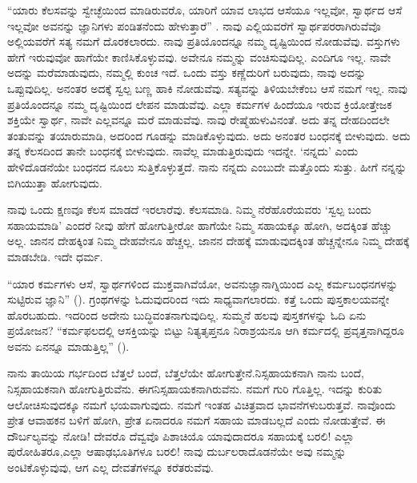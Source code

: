 “ಯಾರು ಕೆಲಸವನ್ನು ಸ್ವೇಚ್ಛೆಯಿಂದ ಮಾಡಿರುವರೊ, ಯಾರಿಗೆ ಯಾವ ಲಾಭದ ಆಸೆಯೂ ಇಲ್ಲವೋ, ಸ್ವಾರ್ಥದ ಆಸೆ ಇಲ್ಲವೋ ಅವನನ್ನು ಜ್ಞಾನಿಗಳು ಪಂಡಿತನೆಂದು ಹೇಳುತ್ತಾರೆ” . ನಾವು ಎಲ್ಲಿಯವರೆಗೆ ಸ್ವಾರ್ಥಪರರಾಗಿರುವೆವೊ ಅಲ್ಲಿಯವರೆಗೆ ಸತ್ಯ ನಮಗೆ ದೊರಕಲಾರದು. ನಾವು ಪ್ರತಿಯೊಂದನ್ನೂ ನಮ್ಮ ದೃಷ್ಟಿಯಿಂದ ನೋಡುವೆವು. ವಸ್ತುಗಳು ಹೇಗೆ ಇರುವುವೋ ಹಾಗೆಯೇ ಕಾಣಿಸಿಕೊಳ್ಳುವವು. ಅವೇನೂ ನಮ್ಮನ್ನು ವಂಚಿಸುವುದಿಲ್ಲ. ಎಂದಿಗೂ ಇಲ್ಲ. ನಾವೇ ಅದನ್ನು ಮರೆಮಾಡುವುದು, ನಮ್ಮಲ್ಲಿ ಕುಂಚ ಇದೆ. ಒಂದು ವಸ್ತು ಕಣ್ಣೆದುರಿಗೆ ಬರುವುದು, ನಾವು ಅದನ್ನು ಒಪ್ಪುವುದಿಲ್ಲ. ಅನಂತರ ಅದಕ್ಕೆ ಸ್ವಲ್ಪ ಬಣ್ಣ ಹಾಕಿ ನೋಡುವೆವು. ಸತ್ಯವನ್ನು ತಿಳಿಯಬೇಕೆಂಬ ಆಸೆ ನಮಗೆ ಇಲ್ಲ. ನಾವು ಪ್ರತಿಯೊಂದನ್ನೂ ನಮ್ಮ ದೃಷ್ಟಿಯಿಂದ ಲೇಪನ ಮಾಡುವೆವು. ಎಲ್ಲಾ ಕರ್ಮಗಳ ಹಿಂದೆಯೂ ಇರುವ ಕ್ರಿಯೋತ್ತೇಜಕ ಶಕ್ತಿಯೇ ಸ್ವಾರ್ಥ, ನಾವೇ ಎಲ್ಲವನ್ನೂ ಮರೆ ಮಾಡುವೆವು. ನಾವು ರೇಷ್ಮೆಹುಳುವಿನಂತೆ. ಅದು ತನ್ನ ದೇಹದಿಂದಲೇ ತಂತುವನ್ನು ತಯಾರುಮಾಡಿ, ಅದರಿಂದ ಗೂಡನ್ನು ಮಾಡಿಕೊಳ್ಳುವುದು. ಅದು ಅನಂತರ ಬಂಧನಕ್ಕೆ ಬೀಳುವುದು. ಅದು ತನ್ನ ಕೆಲಸದಿಂದ ತಾನೇ ಬಂಧನಕ್ಕೆ ಬೀಳುವುದು. ನಾವೆಲ್ಲ ಮಾಡುತ್ತಿರುವುದು ಇದನ್ನೇ. ‘ನನ್ನದು’ ಎಂದು ಹೇಳಿದೊಡನೆಯೇ ಬಂಧನದ ನೂಲು ಸುತ್ತಿಕೊಳ್ಳುತ್ತದೆ. ನಾನು ನನ್ನದು ಎಂಬುದೇ ಮತ್ತೊಂದು ಸುತ್ತು. ಹೀಗೆ ನನ್ನನ್ನು ಬಿಗಿಯುತ್ತಾ ಹೋಗುವುದು.

ನಾವು ಒಂದು ಕ್ಷಣವೂ ಕೆಲಸ ಮಾಡದೆ ಇರಲಾರೆವು. ಕೆಲಸಮಾಡಿ. ನಿಮ್ಮ ನೆರೆಹೊರೆಯವರು ‘ಸ್ವಲ್ಪ ಬಂದು ಸಹಾಯಮಾಡಿ’ ಎಂದರೆ ನೀವು ಹೇಗೆ ಹೋಗುತ್ತೀರೋ ಹಾಗೆಯೇ ನಿಮ್ಮ ಸಹಾಯಕ್ಕೂ ಹೋಗಿ, ಅದಕ್ಕಿಂತ ಹೆಚ್ಚು ಅಲ್ಲ. ಜಾನನ ದೇಹಕ್ಕಿಂತ ನಿಮ್ಮ ದೇಹವೇನೂ ಹೆಚ್ಚಲ್ಲ. ಜಾನನ ದೇಹಕ್ಕೆ ಮಾಡುವುದಕ್ಕಿಂತ ಹೆಚ್ಚನ್ನೇನೂ ನಿಮ್ಮ ದೇಹಕ್ಕೆ ಮಾಡಬೇಡಿ. ಇದೇ ಧರ್ಮ.

“ಯಾರ ಕರ್ಮಗಳು ಆಸೆ, ಸ್ವಾರ್ಥಗಳಿಂದ ಮುಕ್ತವಾಗಿವೆಯೋ, ಅವನು\break ಜ್ಞಾನಾಗ್ನಿಯಿಂದ ಎಲ್ಲ ಕರ್ಮಬಂಧನಗಳನ್ನು ಸುಟ್ಟಿರುವ ಜ್ಞಾನಿ” (). ಗ್ರಂಥಗಳನ್ನು ಓದುವುದರಿಂದ ಇದು ಸಾಧ್ಯವಾಗಲಾರದು. ಕತ್ತೆ ಒಂದು ಪುಸ್ತಕಾಲಯವನ್ನೇ ಹೊರಬಹುದು. ಇದರಿಂದ ಅದೇನು ಬುದ್ಧಿವಂತನಾಗುವುದಿಲ್ಲ. ಸುಮ್ಮನೆ ಹಲವು ಪುಸ್ತಕಗಳನ್ನು ಓದಿ ಏನು ಪ್ರಯೋಜನ? “ಕರ್ಮಫಲದಲ್ಲಿ ಆಸಕ್ತಿಯನ್ನು ಬಿಟ್ಟು ನಿತ್ಯತೃಪ್ತನೂ ನಿರಾಶ್ರಯನೂ ಆಗಿ ಕರ್ಮದಲ್ಲಿ ಪ್ರವೃತ್ತನಾಗಿದ್ದರೂ ಅವನು ಏನನ್ನೂ ಮಾಡುತ್ತಿಲ್ಲ” ().

ನಾನು ತಾಯಿಯ ಗರ್ಭದಿಂದ ಬೆತ್ತಲೆ ಬಂದೆ, ಬೆತ್ತಲೆಯೇ ಹೋಗುತ್ತೇನೆ.\break ನಿಸ್ಸಹಾಯಕನಾಗಿ ನಾನು ಬಂದೆ, ನಿಸ್ಸಹಾಯಕನಾಗಿ ಹೋಗುತ್ತಿರುವೆನು. ಈಗ\break ನಿಸ್ಸಹಾಯಕನಾಗಿರುವೆನು. ನಮಗೆ ಗುರಿ ಗೊತ್ತಿಲ್ಲ. ಇದನ್ನು ಕುರಿತು ಆಲೋಚಿಸು\break ವುದಕ್ಕೂ ನಮಗೆ ಭಯವಾಗುವುದು. ನಮಗೆ ಇಂತಹ ವಿಚಿತ್ರವಾದ ಭಾವನೆಗಳು\break ಬರುತ್ತವೆ. ನಾವೊಂದು ಪ್ರೇತ ಆವಾಹಕನ ಬಳಿಗೆ ಹೋಗಿ, ಪ್ರೇತ ಏನಾದರೂ ನಮಗೆ ಸಹಾಯ ಮಾಡಬಲ್ಲದೆ ಎಂದು ನೋಡುತ್ತೇವೆ. ಈ ದೌರ್ಬಲ್ಯವನ್ನು ನೋಡಿ! ದೇವರೊ ದೆವ್ವವೊ ಪಿಶಾಚಿಯೊ ಯಾವುದಾದರೂ ಸಹಾಯಕ್ಕೆ ಬರಲಿ! ಎಲ್ಲಾ ಪುರೋಹಿತರೂ,\break ಎಲ್ಲಾ ಆಷಾಢಭೂತಿಗಳೂ ಬರಲಿ! ನಾವು ದುರ್ಬಲರಾದೊಡನೆಯೇ ಅವು ನಮ್ಮನ್ನು ಅಂಟಿಕೊಳ್ಳುವುವು, ಆಗ ಎಲ್ಲ ದೇವತೆಗಳನ್ನೂ ಕರೆತರುವೆವು.

